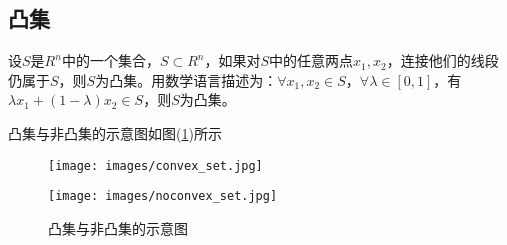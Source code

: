	\subsection{凸集}
		\begin{definition}[凸集]
		设$S$是$R^n$中的一个集合，$S\subset R^n$，如果对$S$中的任意两点$x_1,x_2$，连接他们的线段仍属于$S$，则$S$为凸集。用数学语言描述为：$\forall x_1,x_2\in S$，$\forall \lambda \in [0,1]$，有$\lambda x_1+(1-\lambda)x_2\in S$，则$S$为凸集。
		\end{definition}
		凸集与非凸集的示意图如图(\ref{fig:凸集与非凸集的示意图})所示
		\begin{figure}[H]
		\centering
		\begin{varwidth}[t]{\textwidth}
		\vspace{0pt}
		\texttt{[image: images/convex\_set.jpg]}
		\end{varwidth}
		\qquad \qquad
		\begin{varwidth}[t]{\textwidth}
		\vspace{0pt}
		\texttt{[image: images/noconvex\_set.jpg]}
		\end{varwidth}
		\caption{凸集与非凸集的示意图}
		\label{fig:凸集与非凸集的示意图}
		\end{figure}
